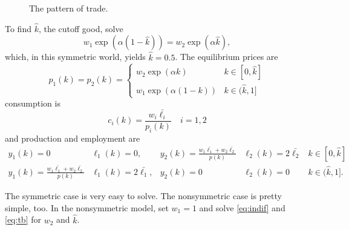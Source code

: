 \documentclass[11pt, pdftex]{article}
\begin{document}
\begin{figure}[ht]
\caption{The pattern of trade.}
\label{fig:dfs}
\centering
{}
\end{figure}

To find $\hat{k}$, the cutoff good, solve
\begin{equation}\label{eq:indif}
  w_1\exp\left(\alpha \left(1-\hat{k}\right)\right) = w_2\exp\left(\alpha \hat{k}\right),
\end{equation}
which, in this symmetric world, yields $\hat{k}=0.5$. The equilibrium prices are
\begin{equation}
  p_1(k)=p_2(k) = \begin{cases}
    w_2\exp(\alpha k) & k \in [0,\hat{k}]\\
    w_1\exp(\alpha (1-k)) & k \in (\hat{k},1]
  \end{cases}
\end{equation}
consumption is
\begin{equation}
  c_i(k) = \frac{w_i\bar{\ell_i}}{p_i(k)}    \quad i=1,2
\end{equation}
and production and employment are
\begin{equation}
\begin{array}{lllll}
y_1(k)=0 & \ell_1(k)=0, & y_2(k)=\frac{w_1\bar{\ell_1}+w_2\bar{\ell_2}}{p(k)} & \ell_2(k)=2\bar{\ell_2} & k \in [0,\hat{k}]\\
y_1(k)=\frac{w_1\bar{\ell_1}+w_2\bar{\ell_2}}{p(k)} & \ell_1(k)=2\bar{\ell_1}, & y_2(k)=0 &\ell_2(k)=0 & k \in (\hat{k},1].
\end{array}
\end{equation}

The symmetric case is very easy to solve.  The nonsymmetric case is pretty simple, too. In the nonsymmetric model, set $w_1=1$ and solve \eqref{eq:indif} and \eqref{eq:tb} for $w_2$ and $\hat{k}$.
\end{document}
